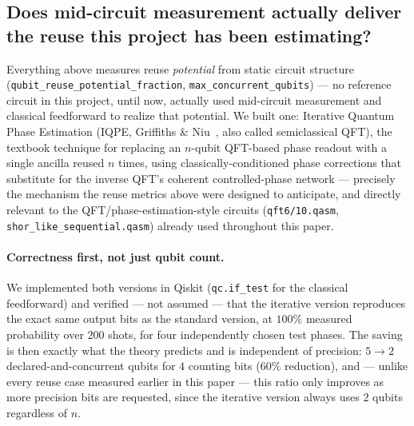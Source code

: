 \documentclass[9pt,twocolumn]{extarticle}
\begin{document}
\subsection{Does mid-circuit measurement actually deliver the reuse this project has been estimating?}
\label{sec:iqpe}
Everything above measures reuse \emph{potential} from static circuit
structure (\texttt{qubit\_reuse\_potential\_fraction},
\texttt{max\_concurrent\_qubits}) --- no reference circuit in this
project, until now, actually used mid-circuit measurement and classical
feedforward to realize that potential. We built one: Iterative Quantum
Phase Estimation (IQPE, Griffiths \& Niu~\cite{griffithsniu1996}, also
called semiclassical QFT), the textbook technique for replacing an
$n$-qubit QFT-based phase readout with a single ancilla reused $n$ times,
using classically-conditioned phase corrections that substitute for the
inverse QFT's coherent controlled-phase network --- precisely the
mechanism the reuse metrics above were designed to anticipate, and
directly relevant to the QFT/phase-estimation-style circuits
(\texttt{qft6/10.qasm}, \texttt{shor\_like\_sequential.qasm}) already used
throughout this paper.

\paragraph{Correctness first, not just qubit count.} We implemented both
versions in Qiskit (\texttt{qc.if\_test} for the classical feedforward)
and verified --- not assumed --- that the iterative version reproduces
the exact same output bits as the standard version, at $100\%$ measured
probability over $200$ shots, for four independently chosen test phases.
The saving is then exactly what the theory predicts and is independent of
precision: $5\to 2$ declared-and-concurrent qubits for $4$ counting bits
($60\%$ reduction), and --- unlike every reuse case measured earlier in
this paper --- this ratio only improves as more precision bits are
requested, since the iterative version always uses $2$ qubits regardless
of $n$.
\end{document}
